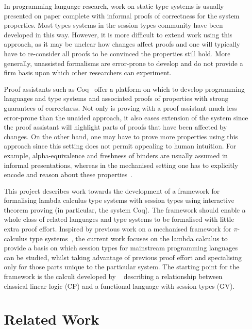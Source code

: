 \documentclass{mpaper}
\begin{document}
In programming language research, work on static type systems is usually
presented on paper complete with informal proofs of correctness for the system
properties. Most types systems in the session types community have been
developed in this way. However, it is more difficult to extend work using this
approach, as it may be unclear how changes affect proofs and one will
typically have to re-consider all proofs to be convinced the properties still
hold. More generally, unassisted formalisms are error-prone to develop and do
not provide a firm basis upon which other researchers can experiment.

Proof assistants such as Coq~\cite{Coq:manual} offer a platform on which to
develop programming languages and type systems and associated proofs of
properties with strong guarantees of correctness. Not only is proving with a
proof assistant much less error-prone than the unaided approach, it also eases
extension of the system since the proof assistant will highlight parts of
proofs that have been affected by changes. On the other hand, one may have to
prove more properties using this approach since this setting does not permit
appealing to human intuition. For example, alpha-equivalence and freshness of
binders are usually assumed in informal presentations, whereas in the
mechanised setting one has to explicitly encode and reason about these
properties~\cite{Aydemir:2005:MMM, Aydemir:2008:EFM}.

This project describes work towards the development of a framework for
formalising lambda calculus type systems with session types using interactive
theorem proving (in particular, the system Coq). The framework should enable a
whole class of related languages and type systems to be formalised with little
extra proof effort. Inspired by previous work on a mechanised framework for
$\pi$-calculus type systems~\cite{Gay:2001:FFP}, the current work focuses on
the lambda calculus to provide a basis on which session types for mainstream
programming languages can be studied, whilst taking advantage of previous
proof effort and specialising only for those parts unique to the particular
system. The starting point for the framework is the calculi developed by
\citeauthor{Wadler:2014}~\cite{Wadler:2014} describing a relationship between
classical linear logic (CP) and a functional language with session types (GV).

\section{Related Work}\label{sec:rw}
\end{document}
